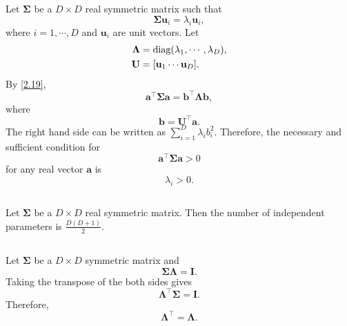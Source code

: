 \subsection{}
\label{2.20}
Let $\bm{\Sigma}$ be a $D \times D$ real symmetric matrix such that
%
\begin{equation}
\bm{\Sigma} 
\mathbf{u}_i 
= 
\lambda_i 
\mathbf{u}_i,
\end{equation}
%
where $i = 1, \cdots, D$ and $\mathbf{u}_i$ are unit vectors.
Let 
%
\begin{equation}
\begin{aligned}
\bm{\Lambda}
&= 
\operatorname{diag} (\lambda_1, \cdots, \lambda_D), 
\\
\mathbf{U} 
&= 
[\mathbf{u}_1 \cdots \mathbf{u}_D].
\end{aligned}
\end{equation}
%
By \ref{2.19}, 
%
\begin{equation}
\mathbf{a} ^ \intercal 
\bm{\Sigma} \mathbf{a}
= 
\mathbf{b} ^ \intercal 
\bm{\Lambda} 
\mathbf{b},
\end{equation}
%
where
%
\begin{equation}
\mathbf{b}
= 
\mathbf{U} ^ \intercal 
\mathbf{a}.
\end{equation}
%
The right hand side can be written as $\sum_{i = 1}^{D} \lambda_i b_i ^ 2$.
Therefore, the necessary and sufficient condition for
%
\begin{equation}
\mathbf{a} ^ \intercal 
\bm{\Sigma} 
\mathbf{a}
> 
0
\end{equation}
%
for any real vector $\mathbf{a}$ is 
%
\begin{equation}
\lambda_i 
> 
0.
\end{equation}
%


\subsection{}
\label{2.21}
Let $\bm{\Sigma}$ be a $D \times D$ real symmetric matrix.
Then the number of independent parameters is $\frac{D (D + 1)}{2}$.


\subsection{}
\label{2.22}
Let $\bm{\Sigma}$ be a $D \times D$ symmetric matrix and
%
\begin{equation}
\bm{\Sigma} \bm{\Lambda}
= 
\mathbf{I}.
\end{equation}
%
Taking the transpose of the both sides gives
%
\begin{equation}
\bm{\Lambda} ^ \intercal 
\bm{\Sigma} 
= 
\mathbf{I}.
\end{equation}
%
Therefore,
%
\begin{equation}
\bm{\Lambda} ^ \intercal
= 
\bm{\Lambda}.
\end{equation}
%



